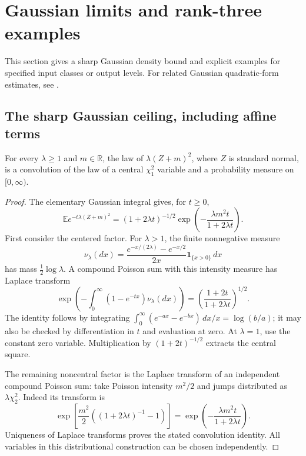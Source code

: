 \section{Gaussian limits and rank-three examples}
\label{sec:gaussian-benchmarks}

This section gives a sharp Gaussian density bound and explicit examples
for specified input classes or output levels.  For related Gaussian
quadratic-form estimates, see \citet{GNSU2019,BNU2020,CK2026}.

\subsection{The sharp Gaussian ceiling, including affine terms}

\begin{lemma}\label{bench:central-square}
For every \(\lambda\geq1\) and \(m\in\mathbb R\), the law of
\(\lambda(Z+m)^2\), where \(Z\) is standard normal, is a convolution of
the law of a central \(\chi_1^2\) variable and a probability measure
on \([0,\infty)\).
\end{lemma}
\begin{proof}
The elementary Gaussian integral gives, for \(t\geq0\),
\[
 \mathbb E e^{-t\lambda(Z+m)^2}
 =(1+2\lambda t)^{-1/2}
       \exp\left(-\frac{\lambda m^2t}{1+2\lambda t}\right).
\]
First consider the centered factor.  For \(\lambda>1\), the finite
nonnegative measure
\[
 \nu_\lambda(dx)=\frac{e^{-x/(2\lambda)}-e^{-x/2}}{2x}
                 \mathbf1_{\{x>0\}}\,dx
\]
has mass \(\tfrac12\log\lambda\).  A compound Poisson sum with this
intensity measure has Laplace transform
\[
 \exp\left(-\int_0^\infty(1-e^{-tx})\nu_\lambda(dx)\right)
 =\left(\frac{1+2t}{1+2\lambda t}\right)^{1/2}.
\]
The identity follows by integrating
\(\int_0^\infty(e^{-ax}-e^{-bx})\,dx/x=\log(b/a)\);
it may also be checked by differentiation in \(t\) and evaluation at
zero.  At \(\lambda=1\), use the constant zero variable.  Multiplication
by \((1+2t)^{-1/2}\) extracts the central square.

The remaining noncentral factor is the Laplace transform of an
independent compound Poisson sum: take Poisson intensity \(m^2/2\)
and jumps distributed as \(\lambda\chi_2^2\).  Indeed its transform is
\[
 \exp\left[\frac{m^2}{2}\left((1+2\lambda t)^{-1}-1\right)\right]
 =\exp\left(-\frac{\lambda m^2t}{1+2\lambda t}\right).
\]
Uniqueness of Laplace transforms proves the stated convolution identity.
All variables in this distributional construction can be chosen
independently.
\end{proof}


